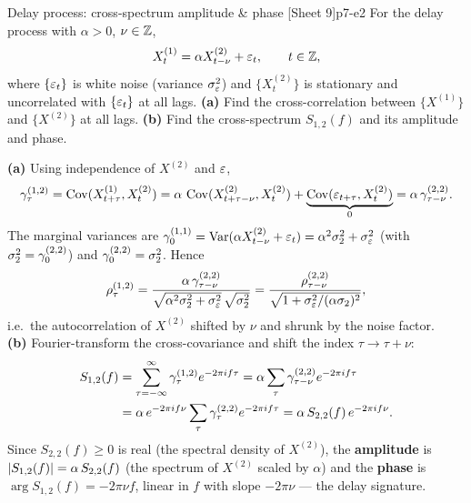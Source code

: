 \begin{exercise}{Delay process: cross-spectrum amplitude \& phase \quad\textnormal{[Sheet 9]}}{p7-e2}
For the delay process with $\alpha>0$, $\nu\in\mathbb{Z}$,
\[
X_t^{(1)}=\alpha X_{t-\nu}^{(2)}+\varepsilon_t,\qquad t\in\mathbb{Z},
\]
where $\{\varepsilon_t\}$ is white noise (variance $\sigma_\varepsilon^2$) and
$\{X_t^{(2)}\}$ is stationary and uncorrelated with $\{\varepsilon_t\}$ at all lags.
\textbf{(a)} Find the cross-correlation between $\{X^{(1)}\}$ and $\{X^{(2)}\}$
at all lags. \textbf{(b)} Find the cross-spectrum $S_{1,2}(f)$ and its amplitude
and phase.
\end{exercise}
\begin{solution}
\textbf{(a)} Using independence of $X^{(2)}$ and $\varepsilon$,
\[
\gamma_\tau^{(1,2)}=\operatorname{Cov}(X_{t+\tau}^{(1)},X_t^{(2)})
=\alpha\,\operatorname{Cov}(X_{t+\tau-\nu}^{(2)},X_t^{(2)})+\underbrace{\operatorname{Cov}(\varepsilon_{t+\tau},X_t^{(2)})}_{0}
=\alpha\,\gamma_{\tau-\nu}^{(2,2)} .
\]
The marginal variances are
$\gamma_0^{(1,1)}=\operatorname{Var}(\alpha X_{t-\nu}^{(2)}+\varepsilon_t)=\alpha^2\sigma_2^2+\sigma_\varepsilon^2$
(with $\sigma_2^2=\gamma_0^{(2,2)}$) and $\gamma_0^{(2,2)}=\sigma_2^2$. Hence
\[
\rho_\tau^{(1,2)}=\frac{\alpha\,\gamma_{\tau-\nu}^{(2,2)}}
{\sqrt{\alpha^2\sigma_2^2+\sigma_\varepsilon^2}\,\sqrt{\sigma_2^2}}
=\frac{\rho_{\tau-\nu}^{(2,2)}}{\sqrt{1+\sigma_\varepsilon^2/(\alpha\sigma_2)^2}} ,
\]
i.e.\ the autocorrelation of $X^{(2)}$ shifted by $\nu$ and shrunk by the noise
factor.\\[4pt]
\textbf{(b)} Fourier-transform the cross-covariance and shift the index
$\tau\to\tau+\nu$:
\[
\begin{aligned}
S_{1,2}(f)
&=\sum_{\tau=-\infty}^{\infty}\gamma_\tau^{(1,2)}e^{-2\pi if\tau}
=\alpha\sum_{\tau}\gamma_{\tau-\nu}^{(2,2)}e^{-2\pi if\tau}\\
&=\alpha\,e^{-2\pi if\nu}\sum_{\tau}\gamma_{\tau}^{(2,2)}e^{-2\pi if\tau}
=\alpha\,S_{2,2}(f)\,e^{-2\pi if\nu}.
\end{aligned}
\]
Since $S_{2,2}(f)\ge0$ is real (the spectral density of $X^{(2)}$), the
\textbf{amplitude} is
$\left\lvert S_{1,2}(f) \right\rvert=\alpha\,S_{2,2}(f)$ (the spectrum of $X^{(2)}$ scaled by
$\alpha$) and the \textbf{phase} is $\arg S_{1,2}(f)=-2\pi\nu f$, linear in $f$
with slope $-2\pi\nu$ --- the delay signature.
\end{solution}

